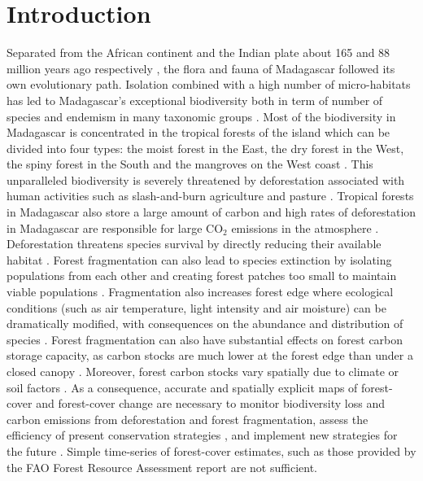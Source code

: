 \documentclass[a4paper, 12pt, leqno]{article} %
\begin{document}
\newpage

\section{Introduction}
\label{introduction}

Separated from the African continent and the Indian plate about 165
and 88 million years ago respectively \citep{Ali2008}, the flora and
fauna of Madagascar followed its own evolutionary path. Isolation
combined with a high number of micro-habitats \citep{Pearson2009} has
led to Madagascar's exceptional biodiversity both in term of number of
species and endemism in many taxonomic groups \citep{Crottini2012,
  Goodman2005}. Most of the biodiversity in Madagascar is
concentrated in the tropical forests of the island which can be
divided into four types: the moist forest in the East, the dry forest
in the West, the spiny forest in the South and the mangroves on the
West coast \citep{Vieilledent2016}. This unparalleled biodiversity is
severely threatened by deforestation \citep{Harper2007,
  Vieilledent2013} associated with human activities such as slash-and-burn
agriculture and pasture \citep{Scales2011}. Tropical forests in
Madagascar also store a large amount of carbon \citep{Vieilledent2016}
and high rates of deforestation in Madagascar are responsible for
large CO$_2$ emissions in the atmosphere
\citep{Achard2014}. Deforestation threatens species survival by
directly reducing their available habitat \citep{Brooks2002,
  Tidd2001}. Forest fragmentation can also lead to species extinction
by isolating populations from each other and creating forest patches
too small to maintain viable populations
\citep{Saunders1991}. Fragmentation also increases forest edge where
ecological conditions (such as air temperature, light intensity and
air moisture) can be dramatically modified, with consequences on the
abundance and distribution of species \citep{Murcia1995}. Forest
fragmentation can also have substantial effects on forest carbon
storage capacity, as carbon stocks are much lower at the forest edge
than under a closed canopy \citep{Brinck2017}. Moreover, forest
carbon stocks vary spatially due to climate or soil factors
\citep{Saatchi2011, Vieilledent2016}. As a consequence, accurate and
spatially explicit maps of forest-cover and forest-cover change are
necessary to monitor biodiversity loss and carbon emissions from
deforestation and forest fragmentation, assess the efficiency of
present conservation strategies \citep{Eklund2016}, and implement new
strategies for the future \citep{Vieilledent2013,
  Vieilledent2016}. Simple time-series of forest-cover estimates, such
as those provided by the FAO Forest Resource Assessment report
\citep{Keenan2015} are not sufficient.
\end{document}
